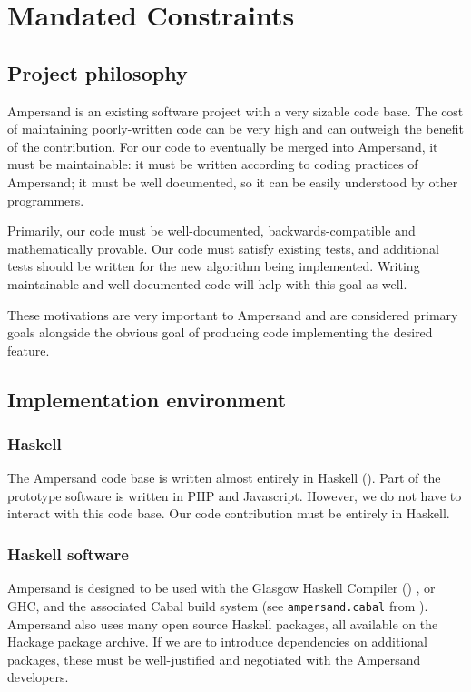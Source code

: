 \documentclass[12pt]{report}
\begin{document}

\section{Mandated Constraints}\label{sec:Constraints}

\subsection{Project philosophy}

Ampersand is an existing software project with a very sizable code base. The
cost of maintaining poorly-written code can be very high and can outweigh the
benefit of the contribution. For our code to eventually be merged into
Ampersand, it must be maintainable: it must be written according to coding
practices of Ampersand; it must be well documented, so it can be easily
understood by other programmers. 

Primarily, our code must be well-documented, backwards-compatible and 
mathematically provable. Our code must satisfy existing tests, and additional 
tests should be written for the new algorithm being implemented. Writing 
maintainable and well-documented code will help with this goal as well.

These motivations are very important to Ampersand and are considered primary
goals alongside the obvious goal of producing code implementing the desired
feature.


\subsection{Implementation environment}
\subsubsection*{Haskell}
The Ampersand code base is written almost entirely in Haskell (\cite{ampSource}). Part of the
prototype software is written in PHP and Javascript. 
However, we do not have to interact with this code base. Our code contribution
must be entirely in Haskell.

\subsubsection*{Haskell software}
Ampersand is designed to be used with the Glasgow Haskell Compiler (\cite{GHC}) , or GHC,
and the associated Cabal build system (see \verb|ampersand.cabal| from \cite{ampSource}). 
Ampersand also uses many open source Haskell packages, all available on the
Hackage package archive. 
If we are to introduce dependencies on additional packages,
  these must be well-justified and negotiated with the Ampersand developers.
\end{document}
